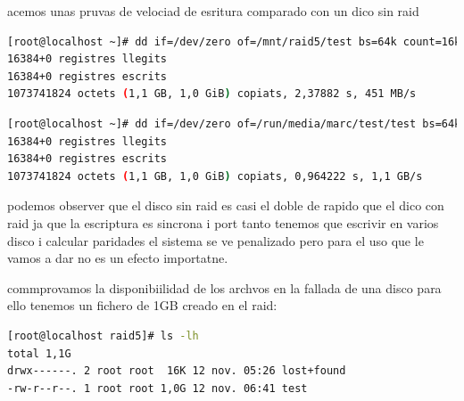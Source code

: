 \documentclass[preprint,11pt]{elsarticle}
\begin{document}
acemos unas pruvas de velociad de esritura comparado con un dico sin raid

\begin{lstlisting}[basicstyle=\tiny, language=bash]
[root@localhost ~]# dd if=/dev/zero of=/mnt/raid5/test bs=64k count=16k conv=fdatasync
16384+0 registres llegits
16384+0 registres escrits
1073741824 octets (1,1 GB, 1,0 GiB) copiats, 2,37882 s, 451 MB/s

\end{lstlisting}

\begin{lstlisting}[basicstyle=\tiny, language=bash]
[root@localhost ~]# dd if=/dev/zero of=/run/media/marc/test/test bs=64k count=16k conv=fdatasync
16384+0 registres llegits
16384+0 registres escrits
1073741824 octets (1,1 GB, 1,0 GiB) copiats, 0,964222 s, 1,1 GB/s

\end{lstlisting}
podemos observer que el disco sin raid es casi el doble de rapido que el dico con raid ja que la escriptura es sincrona i port tanto tenemos que escrivir en varios disco i calcular paridades el sistema se ve penalizado pero para el uso que le vamos a dar no es un efecto importatne. 

commprovamos la disponibiilidad de los archvos en la fallada de una disco para ello tenemos un fichero de 1GB creado en el raid: 

\begin{lstlisting}[basicstyle=\tiny, language=bash]
[root@localhost raid5]# ls -lh
total 1,1G
drwx------. 2 root root  16K 12 nov. 05:26 lost+found
-rw-r--r--. 1 root root 1,0G 12 nov. 06:41 test
\end{lstlisting}
\end{document}
